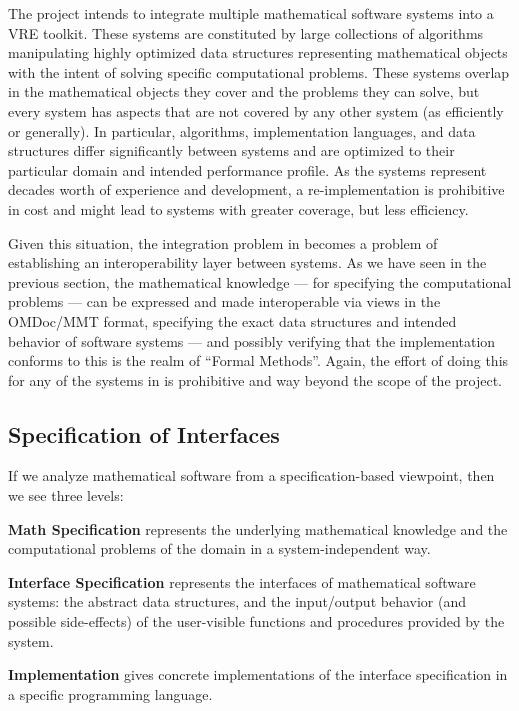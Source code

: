 The \pn project intends to integrate multiple mathematical software systems into a VRE
toolkit. These systems are constituted by large collections of algorithms manipulating
highly optimized data structures representing mathematical objects with the intent of
solving specific computational problems. These systems overlap in the mathematical
objects they cover and the problems they can solve, but every system has aspects that are
not covered by any other system (as efficiently or generally). In particular, algorithms,
implementation languages, and data structures differ significantly between systems and are
optimized to their particular domain and intended performance profile. As the systems
represent decades worth of experience and development, a re-implementation is prohibitive
in cost and might lead to systems with greater coverage, but less efficiency.

Given this situation, the integration problem in \pn becomes a problem of establishing an
interoperability layer between systems. As we have seen in the previous section, the
mathematical knowledge --- for specifying the computational problems --- can be expressed
and made interoperable via views in the OMDoc/MMT format, specifying the exact data
structures and intended behavior of software systems --- and possibly verifying that the
implementation conforms to this is the realm of ``Formal Methods''. Again, the effort of
doing this for any of the systems in \pn is prohibitive and way beyond the scope of the
project.

\subsection{Specification of Interfaces}
If we analyze mathematical software from a specification-based viewpoint, then we see
three levels:
\begin{compactenum}[\rm\bf S1.]
\item \textbf{Math Specification} represents the underlying mathematical knowledge and
  the computational problems of the domain in a system-independent way.
\item \textbf{Interface Specification} represents the interfaces of mathematical software
  systems: the abstract data structures, and the input/output behavior (and possible
  side-effects) of the user-visible functions and procedures provided by the system.
\item \textbf{Implementation} gives concrete implementations of the interface
  specification in a specific programming language.
\end{compactenum}

